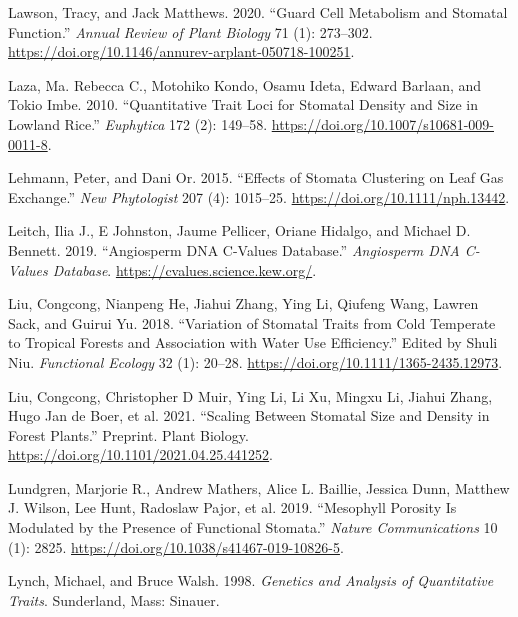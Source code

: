 \documentclass[
  12pt,
]{article}
\newlength{\cslhangindent}
\newlength{\cslentryspacingunit} %
\newenvironment{CSLReferences}[2] %
 {%
  \setlength{\parindent}{0pt}
  \ifodd #1
  \let\oldpar\par
  \def\par{\hangindent=\cslhangindent\oldpar}
  \fi
  \setlength{\parskip}{#2\cslentryspacingunit}
 }%
 {}
\begin{document}
\begin{CSLReferences}{1}{0}
\leavevmode{}%
Lawson, Tracy, and Jack Matthews. 2020. {``Guard {Cell} {Metabolism} and {Stomatal} {Function}.''} \emph{Annual Review of Plant Biology} 71 (1): 273--302. \url{https://doi.org/10.1146/annurev-arplant-050718-100251}.

\leavevmode{}%
Laza, Ma. Rebecca C., Motohiko Kondo, Osamu Ideta, Edward Barlaan, and Tokio Imbe. 2010. {``Quantitative Trait Loci for Stomatal Density and Size in Lowland Rice.''} \emph{Euphytica} 172 (2): 149--58. \url{https://doi.org/10.1007/s10681-009-0011-8}.

\leavevmode{}%
Lehmann, Peter, and Dani Or. 2015. {``Effects of Stomata Clustering on Leaf Gas Exchange.''} \emph{New Phytologist} 207 (4): 1015--25. \url{https://doi.org/10.1111/nph.13442}.

\leavevmode{}%
Leitch, Ilia J., E Johnston, Jaume Pellicer, Oriane Hidalgo, and Michael D. Bennett. 2019. {``Angiosperm {DNA} {C}-Values Database.''} \emph{Angiosperm DNA C-Values Database}. \url{https://cvalues.science.kew.org/}.

\leavevmode{}%
Liu, Congcong, Nianpeng He, Jiahui Zhang, Ying Li, Qiufeng Wang, Lawren Sack, and Guirui Yu. 2018. {``Variation of Stomatal Traits from Cold Temperate to Tropical Forests and Association with Water Use Efficiency.''} Edited by Shuli Niu. \emph{Functional Ecology} 32 (1): 20--28. \url{https://doi.org/10.1111/1365-2435.12973}.

\leavevmode{}%
Liu, Congcong, Christopher D Muir, Ying Li, Li Xu, Mingxu Li, Jiahui Zhang, Hugo Jan de Boer, et al. 2021. {``Scaling Between Stomatal Size and Density in Forest Plants.''} Preprint. Plant Biology. \url{https://doi.org/10.1101/2021.04.25.441252}.

\leavevmode{}%
Lundgren, Marjorie R., Andrew Mathers, Alice L. Baillie, Jessica Dunn, Matthew J. Wilson, Lee Hunt, Radoslaw Pajor, et al. 2019. {``Mesophyll Porosity Is Modulated by the Presence of Functional Stomata.''} \emph{Nature Communications} 10 (1): 2825. \url{https://doi.org/10.1038/s41467-019-10826-5}.

\leavevmode{}%
Lynch, Michael, and Bruce Walsh. 1998. \emph{Genetics and Analysis of Quantitative Traits}. Sunderland, Mass: Sinauer.


\end{CSLReferences}
\end{document}
